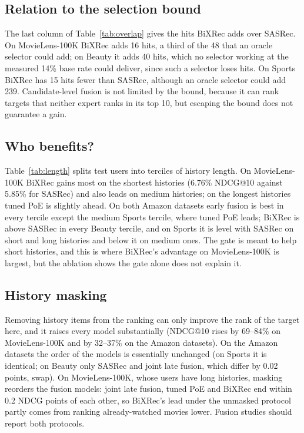 \documentclass[conference]{IEEEtran}
\begin{document}
\subsection{Relation to the selection bound}
The last column of Table~\ref{tab:overlap} gives the hits BiXRec adds over SASRec. On MovieLens-100K BiXRec adds 16
hits, a third of the 48 that an oracle selector could add; on Beauty it adds 40 hits, which no selector working at the
measured 14\% base rate could deliver, since such a selector loses hits. On Sports BiXRec has 15 hits fewer than
SASRec, although an oracle selector could add 239. Candidate-level fusion is not limited by the bound, because it can
rank targets that neither expert ranks in its top 10, but escaping the bound does not guarantee a gain.

\subsection{Who benefits?}
\tabLength
Table~\ref{tab:length} splits test users into terciles of history length. On MovieLens-100K BiXRec gains most on
the shortest histories (6.76\% NDCG@10 against 5.85\% for SASRec) and also leads on medium histories; on the longest
histories tuned PoE is slightly ahead. On both Amazon datasets early fusion is best in every tercile except the
medium Sports tercile, where tuned PoE leads; BiXRec is above SASRec in every Beauty tercile, and on Sports it is level
with SASRec on short and long histories and below it on medium ones. The gate is meant to help short histories, and this is where BiXRec's advantage on MovieLens-100K is
largest, but the ablation shows the gate alone does not explain it.

\subsection{History masking}
\tabMask
Removing history items from the ranking can only improve the rank of the target here, and it raises every model
substantially (NDCG@10 rises by 69--84\% on MovieLens-100K and by 32--37\% on the Amazon datasets). On the Amazon
datasets the order of the models is essentially unchanged (on Sports it is identical; on Beauty only SASRec and joint
late fusion, which differ by 0.02 points, swap). On MovieLens-100K, whose users have long histories, masking reorders the fusion models: joint
late fusion, tuned PoE and BiXRec end within 0.2 NDCG points of each other, so BiXRec's lead under the unmasked
protocol partly comes from ranking already-watched movies lower. Fusion studies should report both protocols.
\end{document}
